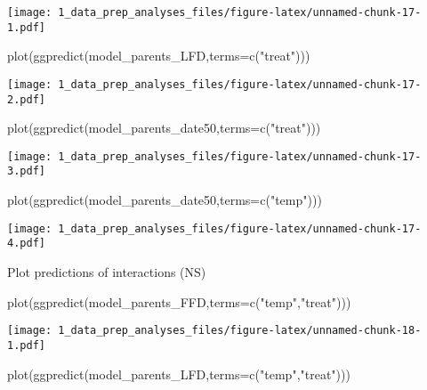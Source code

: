 \documentclass[
]{article}
\newenvironment{Shaded}{\begin{snugshade}}{\end{snugshade}}
\newcommand{\AttributeTok}[1]{\textcolor[rgb]{0.77,0.63,0.00}{#1}}
\newcommand{\FunctionTok}[1]{\textcolor[rgb]{0.00,0.00,0.00}{#1}}
\newcommand{\NormalTok}[1]{#1}
\newcommand{\StringTok}[1]{\textcolor[rgb]{0.31,0.60,0.02}{#1}}
\begin{document}
\texttt{[image: 1\_data\_prep\_analyses\_files/figure-latex/unnamed-chunk-17-1.pdf]}

\begin{Shaded}
\begin{Highlighting}[]
\FunctionTok{plot}\NormalTok{(}\FunctionTok{ggpredict}\NormalTok{(model\_parents\_LFD,}\AttributeTok{terms=}\FunctionTok{c}\NormalTok{(}\StringTok{"treat"}\NormalTok{)))}
\end{Highlighting}
\end{Shaded}

\texttt{[image: 1\_data\_prep\_analyses\_files/figure-latex/unnamed-chunk-17-2.pdf]}

\begin{Shaded}
\begin{Highlighting}[]
\FunctionTok{plot}\NormalTok{(}\FunctionTok{ggpredict}\NormalTok{(model\_parents\_date50,}\AttributeTok{terms=}\FunctionTok{c}\NormalTok{(}\StringTok{"treat"}\NormalTok{)))}
\end{Highlighting}
\end{Shaded}

\texttt{[image: 1\_data\_prep\_analyses\_files/figure-latex/unnamed-chunk-17-3.pdf]}

\begin{Shaded}
\begin{Highlighting}[]
\FunctionTok{plot}\NormalTok{(}\FunctionTok{ggpredict}\NormalTok{(model\_parents\_date50,}\AttributeTok{terms=}\FunctionTok{c}\NormalTok{(}\StringTok{"temp"}\NormalTok{)))}
\end{Highlighting}
\end{Shaded}

\texttt{[image: 1\_data\_prep\_analyses\_files/figure-latex/unnamed-chunk-17-4.pdf]}

Plot predictions of interactions (NS)

\begin{Shaded}
\begin{Highlighting}[]
\FunctionTok{plot}\NormalTok{(}\FunctionTok{ggpredict}\NormalTok{(model\_parents\_FFD,}\AttributeTok{terms=}\FunctionTok{c}\NormalTok{(}\StringTok{"temp"}\NormalTok{,}\StringTok{"treat"}\NormalTok{)))}
\end{Highlighting}
\end{Shaded}

\texttt{[image: 1\_data\_prep\_analyses\_files/figure-latex/unnamed-chunk-18-1.pdf]}

\begin{Shaded}
\begin{Highlighting}[]
\FunctionTok{plot}\NormalTok{(}\FunctionTok{ggpredict}\NormalTok{(model\_parents\_LFD,}\AttributeTok{terms=}\FunctionTok{c}\NormalTok{(}\StringTok{"temp"}\NormalTok{,}\StringTok{"treat"}\NormalTok{)))}
\end{Highlighting}
\end{Shaded}
\end{document}

